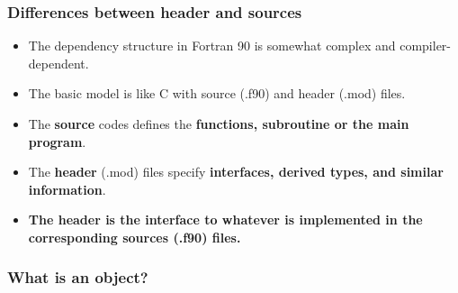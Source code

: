 \documentclass[t]{myBeamer}
\begin{document}
\begin{frame}[t]
\frametitle{ \huge Differences between header and sources}
\begin{itemize}
 \item The dependency structure in Fortran 90 is somewhat complex and compiler-dependent.
 \item The basic model is like C with source (.f90)  and header (.mod) files.
 \item The \textbf{source} codes defines the \textbf{functions, subroutine or the main program}. 
 \item The \textbf{header} (.mod) files specify \textbf{interfaces, derived types, and similar information}.
 \item \textbf{The header is the interface to whatever is implemented in the corresponding sources (.f90) files.}  
\end{itemize}
\end{frame}

\begin{frame}[t]
\frametitle{ \huge What is an object?}

\end{frame}
\end{document}
